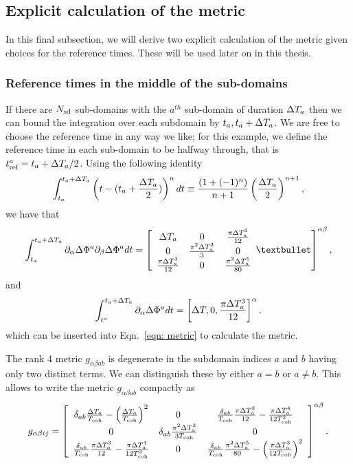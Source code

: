 \documentclass[../full_thesis/full_thesis.tex]{subfiles}
\begin{document}
\subsection{Explicit calculation of the metric}
In this final subsection, we will derive two explicit calculation of the metric
given choices for the reference times. These will be used later on in this
thesis.
\subsubsection{Reference times in the middle of the sub-domains}
If there are $N_{\textrm{sd}}$
sub-domains with the $a^{th}$ sub-domain of duration $\Delta T_a$ then we can bound the
integration over each subdomain by $t_{a}, t_{a} + \Delta T_a$. We are free to choose
the reference time
in any way we like; for this example, we define the reference time in each sub-domain
to be halfway through, that is $t_{\textrm{ref}}^{a} = t_{a} + \Delta T_a/2$. Using the following identity
\begin{align}
\int_{t_{a}}^{t_{a}+\Delta T_a} \left(t - (t_{a} + \frac{\Delta T_a}{2})\right)^{n}
dt \equiv  \frac{\left(1
+(-1)^{n}\right)}{n+1}\left(\frac{\Delta T_a}{2}\right)^{n+1},
\end{align}
we have that
\begin{equation}
\int_{t_{a}}^{t_{a}+\dT_a} \partial_{\alpha}\Delta \Phi^{a}  \partial_{\beta}\Delta \Phi^{a} dt =  \left[\begin{array}{ccc}
\dT_a  & 0 &  \frac{\pi \dT_a^{3}}{12}\\
0 & \frac{\pi^{2}\dT_a^{3}}{3} &  0\\
\frac{\pi \dT_a^{3}}{12} & 0  &  \frac{\pi^{2}\dT_a^{5}}{80}\\
\end{array}•
\right]^{\alpha\beta},
\end{equation}
and
\begin{equation}
\int_{t^{a}}^{t_{a}+\Delta T_a} \partial_{\alpha}\Delta \Phi^{a}  dt =
 \left[\Delta T, 0 , \frac{\pi \Delta T_a^{3}}{12} \right]^{\alpha}.
\end{equation}
which can be inserted into Eqn.~\eqref{eqn: metric} to calculate the metric.

The rank 4 metric $g_{\alpha\beta a b}$ is degenerate in the subdomain indices
$a$ and $b$ having only two distinct terms. We can distinguish these by either
$a=b$ or $a\ne b$. This allows to write the metric $g_{\alpha \beta a b}$
compactly as
\begin{align}
g_{\alpha\beta ij} = \left[\begin{array}{ccc}
\delta_{ab}\frac{\Delta T_a}{T_{\mathrm{coh}}} -\left(\frac{\Delta T_a}{T_{\mathrm{coh}}}\right)^{2}
& 0
& \frac{\delta_{ab}}{T_{\mathrm{coh}}}\frac{\pi \Delta T_a^{3}}{12} - \frac{\pi \Delta T_a^{4}}{12T_{\mathrm{coh}}^{2}}\\
0
& \delta_{ab}\frac{\pi^{2}\Delta T_a^{3}}{3T_{\mathrm{coh}}}
&  0\\
\frac{\delta_{ab}}{T_{\mathrm{coh}}}\frac{\pi \Delta T_a^{3}}{12} - \frac{\pi \Delta T_a^{4}}{12T_{\mathrm{coh}}^{2}}
& 0
&  \frac{\delta_{ab}}{T_{\mathrm{coh}}}\frac{\pi^{2}\Delta T_a^{5}}{80} -  \left(\frac{\pi \Delta T_a^{3}}{12 T_{\mathrm{coh}}}\right)^{2} \\
\end{array}
\right]^{\alpha\beta}.
\label{eqn: metric tref half}
\end{align}
\end{document}

